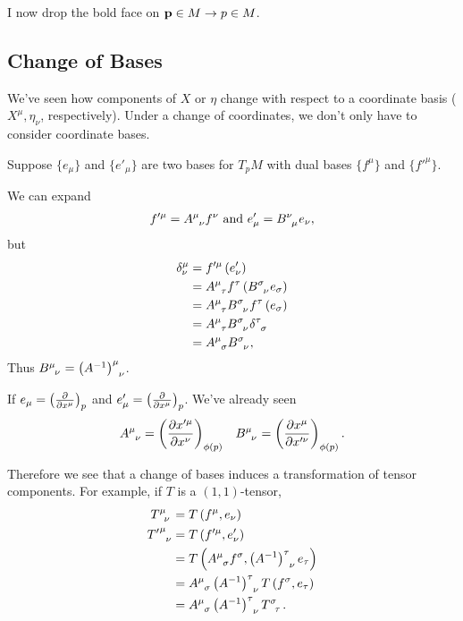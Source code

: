 
\newcommand{\id}{\text{id}}

I now drop the bold face on $\vb{p}\in M \to p \in M$.

\subsection{Change of Bases}

We've seen how components of $X$ or $\eta$ change with respect to a coordinate basis ($X^{\mu}, \eta_\nu$, respectively). Under a change of coordinates, we don't only have to consider coordinate bases.

Suppose $\{e_\mu\} $ and $\{e'_{\mu}\} $ are two bases for $T_p M$ with dual bases $\{f^{\mu}\} $ and $\{f'^{\mu}\} $. 

We can expand
\begin{align}
    f'^{\mu} = \tensor{A}{^{\mu}_\nu} f^{\nu} \text{~and~} e'_{\mu} = \tensor{B}{^{\nu}_\mu} e_\nu
,\end{align}
but
\begin{align}
    \delta^{\mu}_\nu &= f'^{\mu} \left( e'_{\nu} \right)  \\
                     &= \tensor{A}{^{\mu}_\tau} f^{\tau} \left( \tensor{B}{^{\sigma}_\nu} e_\sigma \right) \\
                     &= \tensor{A}{^{\mu}_{\tau}} \tensor{B}{^{\sigma}_{\nu}} f^{\tau} \left( e_{\sigma} \right)  \\
                    &= \tensor{A}{^{\mu}_{\tau}} \tensor{B}{^{\sigma}_{\nu}} \tensor{\delta}{^{\tau}_{\sigma}} \\
                    &= \tensor{A}{^{\mu}_{\sigma}} \tensor{B}{^{\sigma}_{\nu}} 
,\end{align}
Thus $\tensor{B}{^{\mu}_\nu} = \tensor{\left( A^{-1} \right)}{^{\mu}_\nu}$.

If $e_\mu = \left( \pdv{x^{\mu}} \right)_p $ and $e'_\mu = \left( \pdv{x^{\mu}} \right)_p$. We've already seen
\begin{align}
    \tensor{A}{^{\mu}_{\nu}} = \left( \pdv{x'^{\mu}}{x^{\nu}} \right)_{\phi \left( p \right) } && \tensor{B}{^{\mu}_{\nu}} = \left( \pdv{x^{\mu}}{x'^{\nu}} \right)_{\phi \left( p \right) }
.\end{align}

Therefore we see that a change of bases induces a transformation of tensor components. For example, if $T$ is a $\left( 1,1 \right) $-tensor,
\begin{align}
    \tensor{T}{^{\mu}_\nu} &= T \left( f^{\mu}, e_\nu \right)  \\
\tensor{{T'}}{^{\mu}_{\nu}} &= T \left( f'^{\mu}, e'_\nu \right) \\
    &= T \left( \tensor{A}{^{\mu}_\sigma} f^{\sigma}, \tensor{\left( A^{-1} \right) }{^{\tau}_{\nu}} e_{\tau} \right) \\
    &= \tensor{A}{^{\mu}_{\sigma}} \tensor{\left( A^{-1} \right) }{^{\tau}_\nu} T \left( f^{\sigma}, e_{\tau} \right)  \\
    &= \tensor{A}{^{\mu}_{\sigma}} \tensor{\left( A^{-1} \right) }{^{\tau}_{\nu}} \tensor{T}{^{\sigma}_{\tau}}
.\end{align}

